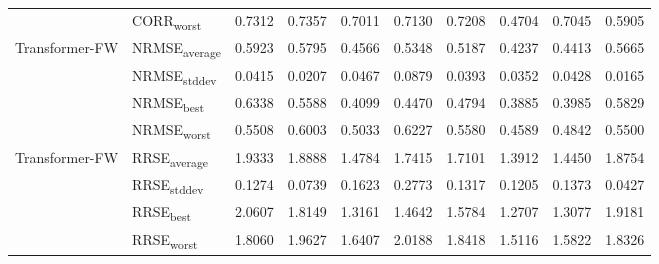{\begin{longtable}{l l c c c c c c c c}
 & CORR\textsubscript{worst} & 0.7312 & 0.7357 & 0.7011 & 0.7130 & 0.7208 & 0.4704 & 0.7045 & 0.5905 \\
\cmidrule(lr){2-10}
\multirow{4}{*}{Transformer-FW} & NRMSE\textsubscript{average} & 0.5923 & 0.5795 & 0.4566 & 0.5348 & 0.5187 & 0.4237 & 0.4413 & 0.5665 \\
 & NRMSE\textsubscript{stddev} & 0.0415 & 0.0207 & 0.0467 & 0.0879 & 0.0393 & 0.0352 & 0.0428 & 0.0165 \\
 & NRMSE\textsubscript{best} & 0.6338 & 0.5588 & 0.4099 & 0.4470 & 0.4794 & 0.3885 & 0.3985 & 0.5829 \\
 & NRMSE\textsubscript{worst} & 0.5508 & 0.6003 & 0.5033 & 0.6227 & 0.5580 & 0.4589 & 0.4842 & 0.5500 \\
\cmidrule(lr){2-10}
\multirow{4}{*}{Transformer-FW} & RRSE\textsubscript{average} & 1.9333 & 1.8888 & 1.4784 & 1.7415 & 1.7101 & 1.3912 & 1.4450 & 1.8754 \\
 & RRSE\textsubscript{stddev} & 0.1274 & 0.0739 & 0.1623 & 0.2773 & 0.1317 & 0.1205 & 0.1373 & 0.0427 \\
 & RRSE\textsubscript{best} & 2.0607 & 1.8149 & 1.3161 & 1.4642 & 1.5784 & 1.2707 & 1.3077 & 1.9181 \\
 & RRSE\textsubscript{worst} & 1.8060 & 1.9627 & 1.6407 & 2.0188 & 1.8418 & 1.5116 & 1.5822 & 1.8326 \\
\cmidrule(lr){2-10}
\end{longtable}
}